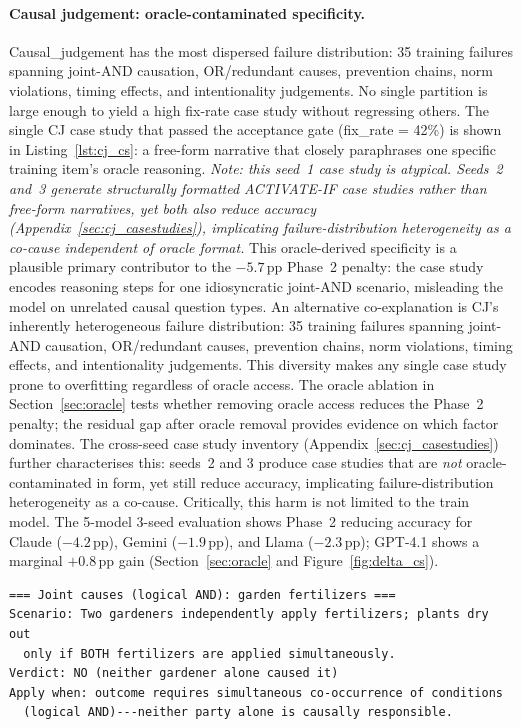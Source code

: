 \documentclass{article}
\begin{document}
\paragraph{Causal judgement: oracle-contaminated specificity.}
Causal\_judgement has the most dispersed failure distribution: 35 training failures spanning
joint-AND causation, OR/redundant causes, prevention chains, norm violations, timing effects,
and intentionality judgements.
No single partition is large enough to yield a high fix-rate case study without regressing
others.
The single CJ case study that passed the acceptance gate (fix\_rate = 42\%) is shown in
Listing~\ref{lst:cj_cs}: a free-form narrative that closely paraphrases one specific training
item's oracle reasoning. \emph{Note: this seed~1 case study is atypical. Seeds~2 and~3 generate
structurally formatted ACTIVATE-IF case studies rather than free-form narratives, yet both
also reduce accuracy (Appendix~\ref{sec:cj_casestudies}), implicating failure-distribution
heterogeneity as a co-cause independent of oracle format.}
This oracle-derived specificity is a plausible primary contributor to the $-5.7$\,pp Phase~2
penalty: the case study encodes reasoning steps for one idiosyncratic joint-AND scenario,
misleading the model on unrelated causal question types.
An alternative co-explanation is CJ's inherently heterogeneous failure distribution: 35 training
failures spanning joint-AND causation, OR/redundant causes, prevention chains, norm violations,
timing effects, and intentionality judgements. This diversity makes any single case study prone to
overfitting regardless of oracle access.
The oracle ablation in Section~\ref{sec:oracle} tests whether removing oracle access reduces
the Phase~2 penalty; the residual gap after oracle removal provides evidence on which factor
dominates.
The cross-seed case study inventory (Appendix~\ref{sec:cj_casestudies}) further characterises
this: seeds~2 and 3 produce case studies that are \emph{not} oracle-contaminated in form,
yet still reduce accuracy, implicating failure-distribution heterogeneity as a co-cause.
Critically, this harm is not limited to the train model. The 5-model 3-seed evaluation shows
Phase~2 reducing accuracy for Claude ($-4.2$\,pp), Gemini ($-1.9$\,pp), and Llama ($-2.3$\,pp);
GPT-4.1 shows a marginal $+0.8$\,pp gain (Section~\ref{sec:oracle} and Figure~\ref{fig:delta_cs}).

\begin{lstlisting}[caption={The single Phase-2 case study generated for causal\_judgement (v3).
  Free-form prose paraphrasing one training item's oracle reasoning, encoding the train
  model's idiosyncratic treatment of joint-AND causation.},
  label={lst:cj_cs}]
=== Joint causes (logical AND): garden fertilizers ===
Scenario: Two gardeners independently apply fertilizers; plants dry out
  only if BOTH fertilizers are applied simultaneously.
Verdict: NO (neither gardener alone caused it)
Apply when: outcome requires simultaneous co-occurrence of conditions
  (logical AND)---neither party alone is causally responsible.
\end{lstlisting}
\end{document}
